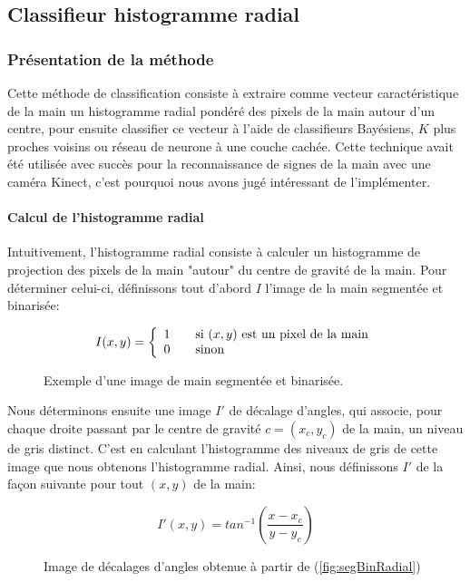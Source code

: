 \subsection{Classifieur histogramme radial}
\subsubsection{Présentation de la méthode}

Cette méthode de classification consiste à extraire comme vecteur caractéristique de la main un histogramme radial pondéré des pixels de la main autour d'un centre, pour ensuite classifier ce vecteur à l'aide de classifieurs Bayésiens, $K$ plus proches voisins ou réseau de neurone à une couche cachée. Cette technique avait été utilisée avec succès pour la reconnaissance de signes de la main avec une caméra Kinect\cite{matthewTang}, c'est pourquoi nous avons jugé intéressant de l'implémenter.

\paragraph{Calcul de l'histogramme radial}
Intuitivement, l'histogramme radial consiste à calculer un histogramme de projection des pixels de la main "autour" du centre de gravité de la main. Pour déterminer celui-ci, définissons tout d'abord $I$ l'image de la main segmentée et binarisée:

\[
I(x,y) = \left\{
  \begin{array}{l l}
    1 & \quad \text{si $(x,y)$ est un pixel de la main}\\
    0 & \quad \text{sinon}
  \end{array} \right.
\]

\begin{figure}[htb!]
\caption{Exemple d'une image de main segmentée et binarisée.}
\label{fig:segBinRadial}
\end{figure}

Nous déterminons ensuite une image $I'$ de décalage d'angles, qui associe, pour chaque droite passant par le centre de gravité $c = (x_c, y_c)$ de la main, un niveau de gris distinct. C'est en calculant l'histogramme des niveaux de gris de cette image que nous obtenons l'histogramme radial. Ainsi, nous définissons $I'$ de la façon suivante pour tout $(x,y)$ de la main:

\[
I'(x,y) = tan^{-1}(\frac{x - x_c}{y - y_c})
\]

\begin{figure}[htb!]
\caption{Image de décalages d'angles obtenue à partir de (\autoref{fig:segBinRadial})}
\label{fig:decalageAngles}
\end{figure}

